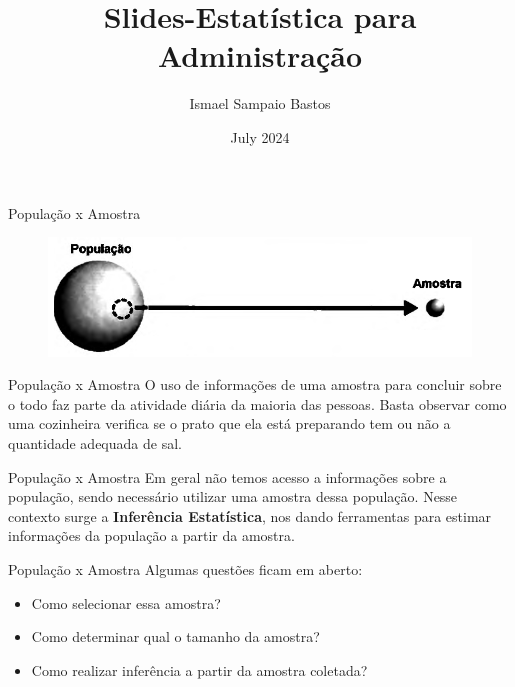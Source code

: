 \documentclass{beamer}
\title{Slides-Estatística para Administração}
\author{ Ismael  Sampaio Bastos}
\date{July 2024}
\begin{document}
\maketitle

\begin{frame}{População x Amostra}

\begin{figure}
    \centering
    \includegraphics[width=0.7\linewidth]{figures/pop_amostra.png}
\end{figure}
    
\end{frame}

\begin{frame}{População x Amostra}
    O uso de informações de uma amostra para concluir sobre o todo faz parte da atividade
diária da maioria das pessoas. Basta observar como uma cozinheira verifica se o prato
que ela está preparando tem ou não a quantidade adequada de sal.
\end{frame}
    
\begin{frame}{População x Amostra}
    Em geral não temos acesso a informações sobre a população, sendo necessário utilizar uma amostra dessa população. Nesse contexto surge a \textbf{Inferência Estatística}, nos dando ferramentas para estimar informações da população a partir da amostra.
\end{frame}
\begin{frame}{População x Amostra}
Algumas questões ficam em aberto:

\begin{itemize}
    \item Como selecionar essa amostra?
    \item Como determinar qual o tamanho da amostra?
    \item Como realizar inferência a partir da amostra coletada?
\end{itemize}
\end{frame}
\end{document}
